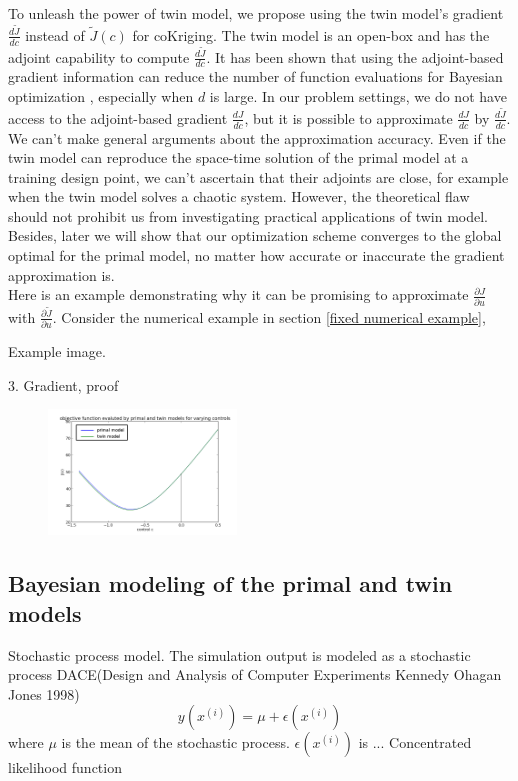 \documentclass[a4paper,onecolumn]{article}
\theoremstyle{remark}
\begin{document}
\noindent To unleash the power of twin model, we propose using the twin model's gradient
$\frac{d\tilde{J}}{d c}$ instead of $\tilde{J}(c)$ for coKriging.
The twin model is an open-box and has the adjoint capability to compute $\frac{d\tilde{J}}{dc}$.
It has been shown that using the adjoint-based gradient information can 
reduce the number of function evaluations for Bayesian optimization
\cite{adjoint gradient cokriging without MLE, gradient kriging surrogate},
especially when $d$ is large. 
In our problem settings, we do not have access to the adjoint-based gradient $\frac{dJ}{dc}$,
but it is possible to approximate $\frac{dJ}{dc}$ by $\frac{d\tilde{J}}{dc}$.
We can't make general arguments about the approximation accuracy. 
Even if the twin model can reproduce the space-time solution of the primal model
at a training design point, we can't ascertain that their adjoints 
are close, for example when the twin model solves a chaotic system.
However, the theoretical flaw should not prohibit us from investigating
practical applications of twin model. Besides, later we will show that our optimization scheme 
converges to the global optimal for the primal model,
no matter how accurate or inaccurate the gradient approximation is.\\

\noindent Here is an example demonstrating why it can be promising to approximate
$\frac{\partial J}{\partial u}$ with $\frac{\partial \tilde{J}}{\partial u}$.
Consider the numerical example in section \ref{fixed numerical example},

Example image.

3. Gradient, proof
   \begin{figure}[H]
       \includegraphics[width=5cm]{J_twin_vs_primal.png}
   \end{figure}



\subsection{Bayesian modeling of the primal and twin models}
\label{bayesian_model}
Stochastic process model. The simulation output is modeled as a stochastic process
DACE(Design and Analysis of Computer Experiments Kennedy Ohagan Jones 1998)
$$
y(x^{(i)}) = \mu + \epsilon(x^{(i)})
$$
where $\mu$ is the mean of the stochastic process. $\epsilon(x^{(i)})$ is ...
Concentrated likelihood function
\end{document}
